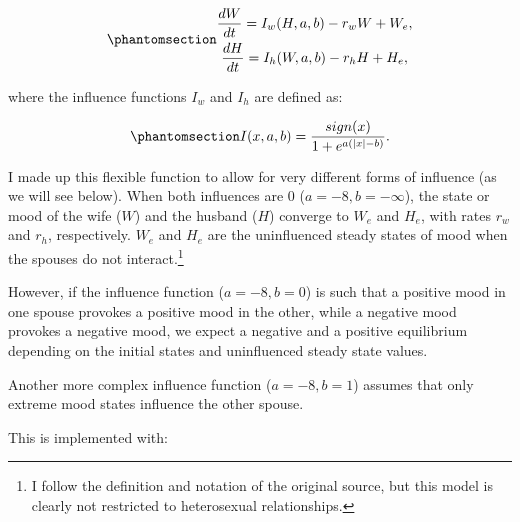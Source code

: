 \documentclass[
  a4paper,
  DIV=11,
  numbers=noendperiod,
  oneside]{scrreprt}
\begin{document}
\begin{equation}\phantomsection\label{eq-ch4n-11-old-31}{
\begin{gathered}
\frac{dW}{dt} = I_{w}(H,a,b) - r_{w}W + W_{e}, \\
\frac{dH}{dt} = I_{h}(W,a,b) - r_{h}H + H_{e},
\end{gathered}
}\end{equation}

where the influence functions \(I_{w}\) and \(I_{h}\) are defined as:

\begin{equation}\phantomsection\label{eq-ch4n-12-old-32}{
I(x,a,b) = \frac{sign(x)}{1 + e^{a\left( |x| - b \right)}}.
}\end{equation}

I made up this flexible function to allow for very different forms of
influence (as we will see below). When both influences are 0
(\(a = - 8,b = - \infty\)), the state or mood of the wife (\(W\)) and
the husband (\(H\)) converge to \(W_{e}\) and \(H_{e}\), with rates
\(r_{w}\) and \(r_{h}\), respectively. \(W_{e}\) and \(H_{e}\) are the
uninfluenced steady states of mood when the spouses do not
interact.\footnote{I follow the definition and notation of the original
  source, but this model is clearly not restricted to heterosexual
  relationships.}

However, if the influence function (\(a = - 8, b = 0\)) is such that a
positive mood in one spouse provokes a positive mood in the other, while
a negative mood provokes a negative mood, we expect a negative and a
positive equilibrium depending on the initial states and uninfluenced
steady state values.

Another more complex influence function (\(a = - 8, b = 1\)) assumes
that only extreme mood states influence the other spouse.

This is implemented with:
\end{document}

